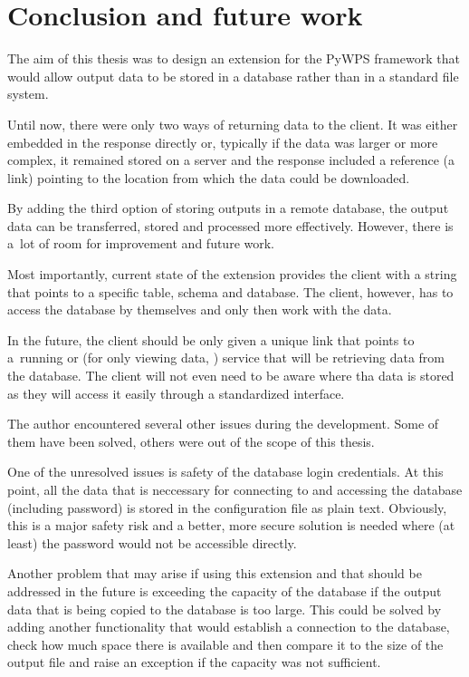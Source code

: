 \chapter{Conclusion and future work}
\label{5-conclusion}


The aim of this thesis was to design an extension for the PyWPS
framework that would allow output data to be stored in a database
rather than in a standard file system.

Until now, there were only two ways of returning data to the
client. It was either embedded in the response directly or, typically
if the data was larger or more complex, it remained stored on a server
and the response included a reference (a~ link) pointing to
the location from which the data could be downloaded.

By adding the third option of storing outputs in a remote database,
the output data can be transferred, stored and processed more
effectively. However, there is a~lot of room for improvement and
future work.

Most importantly, current state of the extension provides the client
with a string that points to a specific table, schema and
database. The client, however, has to access the database by
themselves and only then work with the data.

In the future, the client should be only given a unique  link
that points to a~running  or  (for only viewing data,
) service that will be retrieving data from the database.  The
client will not even need to be aware where tha data is stored as they
will access it easily through a standardized interface.

The author encountered several other issues during the
development. Some of them have been solved, others were out of the
scope of this thesis.

One of the unresolved issues is safety of the database login
credentials. At this point, all the data that is neccessary for
connecting to and accessing the database (including password) is
stored in the configuration file as plain text. Obviously, this is a
major safety risk and a better, more secure solution is needed where
(at least) the password would not be accessible directly.

Another problem that may arise if using this extension and that should
be addressed in the future is exceeding the capacity of the database
if the output data that is being copied to the database is too
large. This could be solved by adding another functionality that would
establish a connection to the database, check how much space there is
available and then compare it to the size of the output file and raise
an exception if the capacity was not sufficient.

